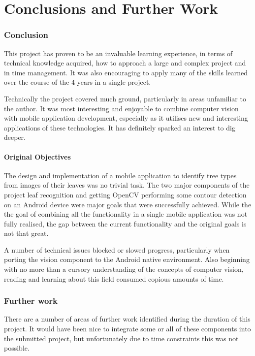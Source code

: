 \chapter{Conclusions and Further Work}



\subsection{Conclusion}




This project has proven to be an invaluable learning experience, in terms of technical knowledge acquired, how to approach a large and complex project and in time management. It was also encouraging to apply many of the skills learned over the course of the 4 years in a single project.

Technically the project covered much ground, particularly in areas unfamiliar to the author. It was most interesting and enjoyable to combine computer vision with mobile application development, especially as it utilises new and interesting applications of these technologies. It has definitely sparked an interest to dig deeper.


\subsubsection{Original Objectives}
The design and implementation of a mobile application to identify tree types from images of their leaves was no trivial task. The two major components of the project leaf recognition and getting OpenCV performing some contour detection on an Android device were major goals that were successfully achieved. While the the goal of combining all the functionality in a single mobile application was not fully realised, the gap between the current functionality and the original goals is not that great. 

A number of technical issues blocked or slowed progress, particularly when porting the vision component to the Android native environment. Also beginning with no more than a cursory understanding of the concepts of computer vision, reading and learning about this field consumed copious amounts of time.

\subsection{Further work}

There are a number of areas of further work identified during the duration of this project. It would have been nice to integrate some or all of these components into the submitted project, but unfortunately due to time constraints this was not possible.

